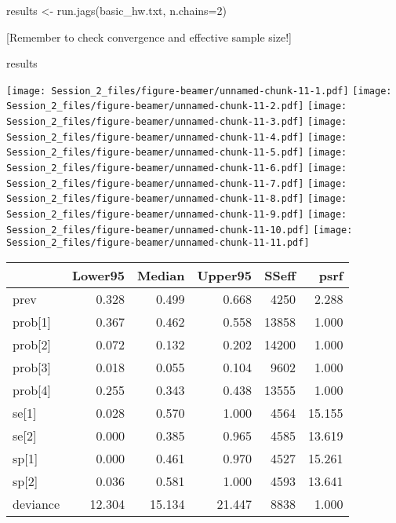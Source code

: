 \documentclass[
  ignorenonframetext,
  aspectratio=169,
]{beamer}
\newenvironment{Shaded}{\begin{snugshade}}{\end{snugshade}}
\newcommand{\AttributeTok}[1]{\textcolor[rgb]{0.77,0.63,0.00}{#1}}
\newcommand{\DecValTok}[1]{\textcolor[rgb]{0.00,0.00,0.81}{#1}}
\newcommand{\FunctionTok}[1]{\textcolor[rgb]{0.00,0.00,0.00}{#1}}
\newcommand{\NormalTok}[1]{#1}
\newcommand{\OtherTok}[1]{\textcolor[rgb]{0.56,0.35,0.01}{#1}}
\newcommand{\StringTok}[1]{\textcolor[rgb]{0.31,0.60,0.02}{#1}}
\begin{document}
\begin{frame}[fragile]
\begin{Shaded}
\begin{Highlighting}[]
\NormalTok{results }\OtherTok{\textless{}{-}} \FunctionTok{run.jags}\NormalTok{(}\StringTok{\textquotesingle{}basic\_hw.txt\textquotesingle{}}\NormalTok{, }\AttributeTok{n.chains=}\DecValTok{2}\NormalTok{)}
\end{Highlighting}
\end{Shaded}

\normalsize

{[}Remember to check convergence and effective sample size!{]}
\end{frame}

\begin{frame}[fragile]
\scriptsize

\begin{Shaded}
\begin{Highlighting}[]
\NormalTok{results}
\end{Highlighting}
\end{Shaded}

\normalsize

\scriptsize\texttt{[image: Session\_2\_files/figure-beamer/unnamed-chunk-11-1.pdf]}
\texttt{[image: Session\_2\_files/figure-beamer/unnamed-chunk-11-2.pdf]}
\texttt{[image: Session\_2\_files/figure-beamer/unnamed-chunk-11-3.pdf]}
\texttt{[image: Session\_2\_files/figure-beamer/unnamed-chunk-11-4.pdf]}
\texttt{[image: Session\_2\_files/figure-beamer/unnamed-chunk-11-5.pdf]}
\texttt{[image: Session\_2\_files/figure-beamer/unnamed-chunk-11-6.pdf]}
\texttt{[image: Session\_2\_files/figure-beamer/unnamed-chunk-11-7.pdf]}
\texttt{[image: Session\_2\_files/figure-beamer/unnamed-chunk-11-8.pdf]}
\texttt{[image: Session\_2\_files/figure-beamer/unnamed-chunk-11-9.pdf]}
\texttt{[image: Session\_2\_files/figure-beamer/unnamed-chunk-11-10.pdf]}
\texttt{[image: Session\_2\_files/figure-beamer/unnamed-chunk-11-11.pdf]}
\normalsize

\scriptsize

\begin{longtable}[]{@{}lrrrrr@{}}
\toprule
& Lower95 & Median & Upper95 & SSeff & psrf \\
\midrule
\endhead
prev & 0.328 & 0.499 & 0.668 & 4250 & 2.288 \\
prob{[}1{]} & 0.367 & 0.462 & 0.558 & 13858 & 1.000 \\
prob{[}2{]} & 0.072 & 0.132 & 0.202 & 14200 & 1.000 \\
prob{[}3{]} & 0.018 & 0.055 & 0.104 & 9602 & 1.000 \\
prob{[}4{]} & 0.255 & 0.343 & 0.438 & 13555 & 1.000 \\
se{[}1{]} & 0.028 & 0.570 & 1.000 & 4564 & 15.155 \\
se{[}2{]} & 0.000 & 0.385 & 0.965 & 4585 & 13.619 \\
sp{[}1{]} & 0.000 & 0.461 & 0.970 & 4527 & 15.261 \\
sp{[}2{]} & 0.036 & 0.581 & 1.000 & 4593 & 13.641 \\
deviance & 12.304 & 15.134 & 21.447 & 8838 & 1.000 \\
\bottomrule
\end{longtable}


\end{frame}
\end{document}
